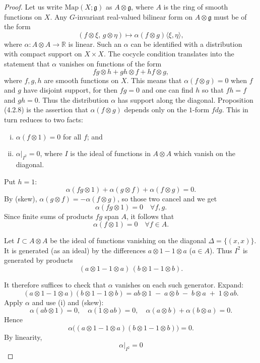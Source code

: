 \documentclass[12pt]{article}
\begin{document}
\noindent
\begin{proof}
    Let us write $\mathrm{Map}(X;\mathfrak{g})$ as
    $A \otimes \mathfrak{g}$, where $A$ is the ring of smooth functions on $X$.
    Any $G$-invariant real-valued bilinear form on $A \otimes \mathfrak{g}$ must be of the form
    \[
        (f \otimes \xi, \, g \otimes \eta) \mapsto \alpha(f \otimes g) \langle \xi,\eta \rangle,
    \]
    where $\alpha : A \otimes A \to \mathbb{R}$ is linear. Such an $\alpha$ can be identified
    with a distribution with compact support on $X \times X$. The cocycle condition translates
    into the statement that $\alpha$ vanishes on functions of the form
    \begin{equation} \label{eq:4.2.10}
        fg \otimes h + gh \otimes f + hf \otimes g,
    \end{equation}
    where $f,g,h$ are smooth functions on $X$. This means that $\alpha(f \otimes g) = 0$
    when $f$ and $g$ have disjoint support, for then $fg=0$ and one can find $h$ so that
    $fh=f$ and $gh=0$. Thus the distribution $\alpha$ has support along the diagonal.
    Proposition (4.2.8) is the assertion that $\alpha(f \otimes g)$ depends only on the
    $1$-form $fdg$. This in turn reduces to two facts:
    \begin{enumerate}[(i)]
        \item $\alpha(f \otimes 1)=0$ for all $f$; and
        \item $\alpha\vert_{I^2} = 0$, where $I$ is the ideal of functions in $A \otimes A$
              which vanish on the diagonal.
    \end{enumerate}
    Put $h=1$:
    \[
        \alpha(fg \otimes 1) + \alpha(g \otimes f) + \alpha(f \otimes g) = 0.
    \]
    By (skew), $\alpha(g \otimes f) = -\alpha(f \otimes g)$, so those two cancel and we get
    \[
        \alpha(fg \otimes 1) = 0 \quad \forall f,g.
    \]
    Since finite sums of products $fg$ span $A$, it follows that
    \[
        \alpha(f \otimes 1) = 0 \quad \forall f \in A.
    \]

    Let $I \subset A \otimes A$ be the ideal of functions vanishing on the diagonal $\Delta = \{(x,x)\}$. It is generated (as an ideal) by the differences $a \otimes 1 - 1 \otimes a$ ($a \in A$). Thus $I^2$ is generated by products
    \[
        (a \otimes 1 - 1 \otimes a)\,(b \otimes 1 - 1 \otimes b).
    \]

    It therefore suffices to check that $\alpha$ vanishes on each such generator. Expand:
    \[
        (a \otimes 1 - 1 \otimes a)(b \otimes 1 - 1 \otimes b)
        = ab \otimes 1 \;-\; a \otimes b \;-\; b \otimes a \;+\; 1 \otimes ab.
    \]
    Apply $\alpha$ and use (i) and (skew):
    \[
        \alpha(ab \otimes 1) = 0, \quad \alpha(1 \otimes ab) = 0, \quad
        \alpha(a \otimes b) + \alpha(b \otimes a) = 0.
    \]
    Hence
    \[
        \alpha\big((a \otimes 1 - 1 \otimes a)(b \otimes 1 - 1 \otimes b)\big) = 0.
    \]
    By linearity,
    \[
        \alpha|_{I^2} = 0
    \]


\end{proof}
\end{document}
